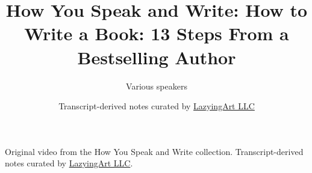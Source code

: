 \documentclass[11pt,oneside]{book}
\begin{document}
\frontmatter
\title{How You Speak and Write: How to Write a Book: 13 Steps From a Bestselling Author}
\author{Various speakers}
\date{Transcript-derived notes curated by \href{https://lazying.art}{LazyingArt LLC}}
\maketitle
\begin{center}
\small Original video from the How You Speak and Write collection. Transcript-derived notes curated by \href{https://lazying.art}{LazyingArt LLC}.
\end{center}
\clearpage
\mainmatter

\end{document}

